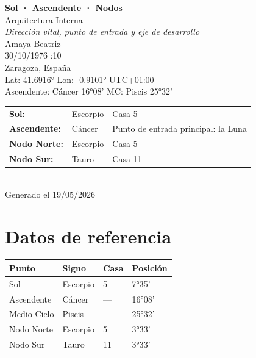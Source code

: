 \documentclass[11pt,a4paper]{article}
\begin{document}
\begin{titlepage}
  \centering
  \vspace*{1.5cm}
  {\Huge\bfseries\color{azulai} Sol · Ascendente · Nodos}\\[0.5cm]
  {\large\color{grisai} Arquitectura Interna}\\[0.3cm]
  {\small\itshape\color{grisai} Dirección vital, punto de entrada y eje de desarrollo}\\[2cm]
  {\huge\color{doradoai} Amaya Beatriz}\\[1.5cm]
  {\Large 30/10/1976 :10}\\[0.3cm]
  {\Large Zaragoza, España}\\[0.3cm]
  {\normalsize Lat: 41.6916° \quad Lon: -0.9101° \quad UTC+01:00}\\[0.3cm]
  {\normalsize Ascendente: Cáncer 16°08' \quad
    MC: Piscis 25°32'}\\[2cm]
  \begin{tabular}{lll}
    \textbf{Sol:} & Escorpio & Casa 5 \\
    \textbf{Ascendente:} & Cáncer & Punto de entrada principal: la Luna \\
    \textbf{Nodo Norte:} & Escorpio & Casa 5 \\
    \textbf{Nodo Sur:}   & Tauro & Casa 11 \\
  \end{tabular}\\[2cm]
  \vfill
  {\small Generado el 19/05/2026}
\end{titlepage}

\tableofcontents
\newpage

\section{Datos de referencia}

\begin{center}
\begin{tabular}{llll}
  \toprule
  \textbf{Punto} & \textbf{Signo} & \textbf{Casa} & \textbf{Posición} \\
  \midrule
  Sol           & Escorpio & 5 & 7°35' \\
  Ascendente    & Cáncer & --- & 16°08' \\
  Medio Cielo   & Piscis & --- & 25°32' \\
  Nodo Norte    & Escorpio & 5 & 3°33' \\
  Nodo Sur      & Tauro & 11 & 3°33' \\
  \bottomrule
\end{tabular}
\end{center}
\end{document}
